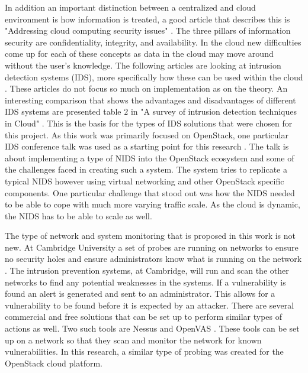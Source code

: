\documentclass[12pt]{article}
\begin{document}
In addition an important distinction between a centralized and cloud environment is how information is treated, a good article that describes this is "Addressing cloud computing security issues" \cite{zissis2012addressing}. The three pillars of information security are confidentiality, integrity, and availability. In the cloud new difficulties come up for each of these concepts as data in the cloud may move around without the user's knowledge.  The following articles are looking at intrusion detection systems (IDS), more specifically how these can be used within the cloud \cite{SurveyOfIDS, patel2013intrusion}. These articles do not focus so much on implementation as on the theory. An interesting comparison that shows the advantages and disadvantages of different IDS systems are presented table $2$ in "A survey of intrusion detection techniques in Cloud" \cite{SurveyOfIDS}. This is the basis for the types of IDS solutions that were chosen for this project. As this work was primarily focused on OpenStack, one particular IDS conference talk was used as a starting point for this research \cite{videoPresentation}. The talk is about implementing a type of NIDS into the OpenStack ecosystem and some of the challenges faced in creating such a system. The system tries to replicate a typical NIDS however using virtual networking and other OpenStack specific components. One particular challenge that stood out was how the NIDS needed to be able to cope with much more varying traffic scale. As the cloud is dynamic, the NIDS has to be able to scale as well.

The type of network and system monitoring that is proposed in this work is not new. At Cambridge University a set of probes are running on networks to ensure no security holes and ensure administrators know what is running on the network \cite{CambUni}. The intrusion prevention systems, at Cambridge, will run and scan the other networks to find any potential weaknesses in the systems. If a vulnerability is found an alert is generated and sent to an administrator. This allows for a vulnerability to be found before it is expected by an attacker. There are several commercial and free solutions that can be set up to perform similar types of actions as well. Two such tools are Nessus \cite{Nessus} and OpenVAS \cite{OpenVAS}. These tools can be set up on a network so that they scan and monitor the network for known vulnerabilities. In this research, a similar type of probing was created for the OpenStack cloud platform.
\end{document}
